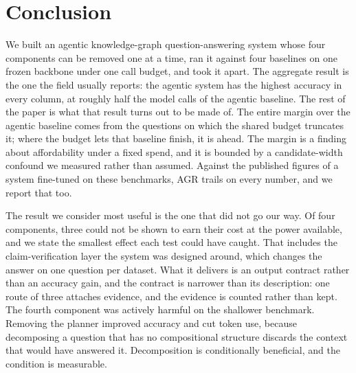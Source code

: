 %

\section{Conclusion}\label{sec:conclusion}

We built an agentic knowledge-graph question-answering system whose four
components can be removed one at a time, ran it against four baselines
on one frozen backbone under one call budget, and took it apart. The
aggregate result is the one the field usually reports: the agentic
system has the highest accuracy in every column, at roughly half the
model calls of the agentic baseline. The rest of the paper is what that
result turns out to be made of. The entire margin over the agentic
baseline comes from the questions on which the shared budget truncates
it; where the budget lets that baseline finish, it is ahead. The margin
is a finding about affordability under a fixed spend, and it is bounded
by a candidate-width confound we measured rather than assumed. Against
the published figures of a system fine-tuned on these benchmarks, AGR
trails on every number, and we report that too.

The result we consider most useful is the one that did not go our way.
Of four components, three could not be shown to earn their cost at the
power available, and we state the smallest effect each test could have
caught. That includes the claim-verification layer the system was
designed around, which changes the answer on one question per dataset.
What it delivers is an output contract rather than an accuracy gain, and
the contract is narrower than its description: one route of three
attaches evidence, and the evidence is counted rather than kept. The
fourth component was actively harmful on the shallower benchmark.
Removing the planner improved accuracy and cut token use, because
decomposing a question that has no compositional structure discards the
context that would have answered it. Decomposition is conditionally
beneficial, and the condition is measurable.

